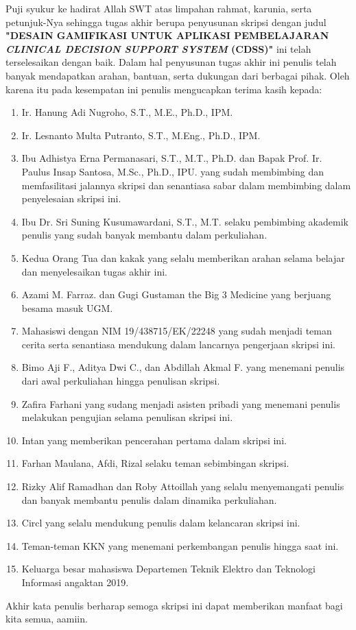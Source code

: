 
Puji syukur ke hadirat Allah SWT atas limpahan rahmat, karunia, serta petunjuk-Nya sehingga tugas akhir berupa penyusunan skripsi 
dengan judul \textbf{"DESAIN GAMIFIKASI UNTUK APLIKASI PEMBELAJARAN \textit{CLINICAL DECISION SUPPORT SYSTEM} (CDSS)"}
ini telah terselesaikan dengan baik. Dalam hal penyusunan tugas akhir ini penulis telah banyak mendapatkan arahan, bantuan, serta dukungan dari berbagai pihak. 
Oleh karena itu pada kesempatan ini penulis mengucapkan terima kasih kepada:

\begin{enumerate}
	\item Ir. Hanung Adi Nugroho, S.T., M.E., Ph.D., IPM.
	\item Ir. Lesnanto Multa Putranto, S.T., M.Eng., Ph.D., IPM.
	\item Ibu Adhistya Erna Permanasari, S.T., M.T., Ph.D. dan Bapak Prof. Ir. Paulus Insap Santosa, M.Sc., Ph.D., IPU. yang sudah membimbing dan memfasilitasi jalannya skripsi dan senantiasa sabar dalam membimbing dalam penyelesaian skripsi ini.
	\item Ibu Dr. Sri Suning Kusumawardani, S.T., M.T. selaku pembimbing akademik penulis yang sudah banyak membantu dalam perkuliahan.
	\item Kedua Orang Tua dan kakak yang selalu memberikan arahan selama belajar dan menyelesaikan tugas akhir ini.
	\item Azami M. Farraz. dan Gugi Gustaman the Big 3 Medicine yang berjuang besama masuk UGM.
	\item Mahasiswi dengan NIM 19/438715/EK/22248 yang sudah menjadi teman cerita serta senantiasa mendukung dalam lancarnya pengerjaan skripsi ini.
	\item Bimo Aji F., Aditya Dwi C., dan Abdillah Akmal F. yang menemani penulis dari awal perkuliahan hingga penulisan skripsi.
	\item Zafira Farhani yang sudang menjadi asisten pribadi yang menemani penulis melakukan pengujian selama penulisan skripsi ini.
	\item Intan yang memberikan pencerahan pertama dalam skripsi ini.
	\item Farhan Maulana, Afdi, Rizal selaku teman sebimbingan skripsi.
	\item Rizky Alif Ramadhan dan Roby Attoillah yang selalu menyemangati penulis dan banyak membantu penulis dalam dinamika perkuliahan.
	\item Circl yang selalu mendukung penulis dalam kelancaran skripsi ini.
	\item Teman-teman KKN yang menemani perkembangan penulis hingga saat ini.
	\item Keluarga besar mahasiswa Departemen Teknik Elektro dan Teknologi Informasi angaktan 2019.
\end{enumerate}

Akhir kata penulis berharap semoga skripsi ini dapat memberikan manfaat bagi kita semua, aamiin.

